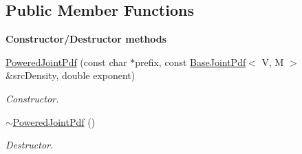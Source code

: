 \subsection*{Public Member Functions}
\begin{Indent}{\bf Constructor/\-Destructor methods}\par
\begin{DoxyCompactItemize}
\item 
\hyperlink{class_q_u_e_s_o_1_1_powered_joint_pdf_aaad4fce3dbea49b17af2ac3101e757c1}{Powered\-Joint\-Pdf} (const char $\ast$prefix, const \hyperlink{class_q_u_e_s_o_1_1_base_joint_pdf}{Base\-Joint\-Pdf}$<$ V, M $>$ \&src\-Density, double exponent)
\begin{DoxyCompactList}\small\item\em Constructor. \end{DoxyCompactList}\item 
\hyperlink{class_q_u_e_s_o_1_1_powered_joint_pdf_abc4364733cade0f91fd9927e68d1fe85}{$\sim$\-Powered\-Joint\-Pdf} ()
\begin{DoxyCompactList}\small\item\em Destructor. \end{DoxyCompactList}\end{DoxyCompactItemize}
\end{Indent}
